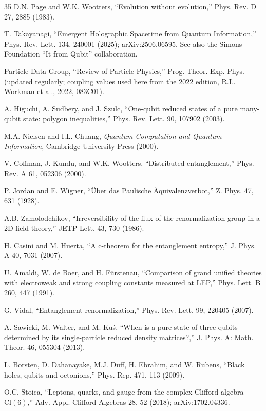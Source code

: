 \documentclass[11pt]{article}
\begin{document}
\begin{thebibliography}{35}
 D.N. Page and W.K. Wootters, ``Evolution without evolution,'' Phys. Rev. D 27, 2885 (1983).

 T. Takayanagi, ``Emergent Holographic Spacetime from Quantum Information,'' Phys. Rev. Lett. 134, 240001 (2025); arXiv:2506.06595. See also the Simons Foundation ``It from Qubit'' collaboration.

 Particle Data Group, ``Review of Particle Physics,'' Prog. Theor. Exp. Phys. (updated regularly; coupling values used here from the 2022 edition, R.L. Workman et al., 2022, 083C01).

 A. Higuchi, A. Sudbery, and J. Szulc, ``One-qubit reduced states of a pure many-qubit state: polygon inequalities,'' Phys. Rev. Lett. 90, 107902 (2003).

 M.A. Nielsen and I.L. Chuang, \emph{Quantum Computation and Quantum Information}, Cambridge University Press (2000).

 V. Coffman, J. Kundu, and W.K. Wootters, ``Distributed entanglement,'' Phys. Rev. A 61, 052306 (2000).

 P. Jordan and E. Wigner, ``\"Uber das Paulische \"Aquivalenzverbot,'' Z. Phys. 47, 631 (1928).

 A.B. Zamolodchikov, ``Irreversibility of the flux of the renormalization group in a 2D field theory,'' JETP Lett. 43, 730 (1986).

 H. Casini and M. Huerta, ``A c-theorem for the entanglement entropy,'' J. Phys. A 40, 7031 (2007).

 U. Amaldi, W. de Boer, and H. F\"urstenau, ``Comparison of grand unified theories with electroweak and strong coupling constants measured at LEP,'' Phys. Lett. B 260, 447 (1991).

 G. Vidal, ``Entanglement renormalization,'' Phys. Rev. Lett. 99, 220405 (2007).

 A. Sawicki, M. Walter, and M. Ku\'s, ``When is a pure state of three qubits determined by its single-particle reduced density matrices?,'' J. Phys. A: Math. Theor. 46, 055304 (2013).

 L. Borsten, D. Dahanayake, M.J. Duff, H. Ebrahim, and W. Rubens, ``Black holes, qubits and octonions,'' Phys. Rep. 471, 113 (2009).

 O.C. Stoica, ``Leptons, quarks, and gauge from the complex Clifford algebra $\mathrm{Cl}(6)$,'' Adv. Appl. Clifford Algebras 28, 52 (2018); arXiv:1702.04336.


\end{thebibliography}
\end{document}
